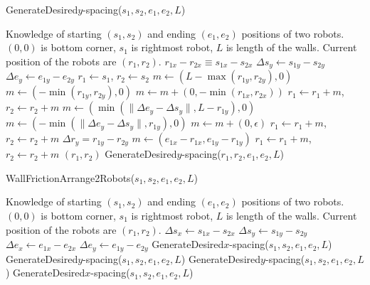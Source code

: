 \begin{algorithm}
\caption{GenerateDesired$y$-spacing($s_1,s_2,e_1,e_2,L$)}\label{alg:YControl}
\begin{algorithmic}[1]
\Require Knowledge of starting $(s_1,s_2)$ and ending $(e_1,e_2)$ positions of  two robots. 
$(0,0)$ is bottom corner, $s_1$ is rightmost robot, 
 $L$ is length of the walls. Current position of the robots are $(r_1,r_2)$.
\Ensure   $ r_{1x} - r_{2x}  \equiv s_{1x} - s_{2x} $   %
\State $ \Delta s_y  \gets s_{1y} - s_{2y} $
\State $ \Delta e_y \gets e_{1y} - e_{2y} $
\State $ r_1 \gets s_1$, $ r_2 \gets s_2$
\State $ m \gets ( L-\max( r_{1y},r_{2y}) ,0)   $ 
\Else 
\State  $ m \gets ( -\min( r_{1y},r_{2y}),0 )    $ 
\EndIf
\State $m  \gets  m + (0, -\min( r_{1x},r_{2x} ))$ 
\State $ r_1 \gets r_1+m$, $ r_2 \gets r_2+m$ 
\State $ m \gets (\min(\|\Delta e_y - \Delta s_y \|, L- r_{1y}), 0)$  
\Else
\State $ m \gets (-\min(\|\Delta e_y - \Delta s_y \|, r_{1y}), 0)$
\EndIf 
\State $m  \gets  m + (0, \epsilon)$ 
\State $ r_1 \gets r_1+m$, $ r_2 \gets r_2+m$ 
\State $\Delta r_y = r_{1y} - r_{2y}$
\State   $ m \gets (e_{1x}-r_{1x}, e_{1y}-r_{1y})$
\State $ r_1 \gets r_1+m$, $ r_2 \gets r_2+m$ 
\State  \Return $(r_1,r_2)$
\Else   
\State \Return GenerateDesired$y$-spacing($r_1,r_2,e_1,e_2,L$)
\EndIf
\end{algorithmic}
\end{algorithm}

\begin{algorithm}
\caption{WallFrictionArrange2Robots($s_1,s_2,e_1,e_2,L$)}\label{alg:PosControl2Robots}
\begin{algorithmic}[1]
\Require 
Knowledge of starting $(s_1,s_2)$ and ending $(e_1,e_2)$ positions of  two robots. 
$(0,0)$ is bottom corner, $s_1$ is rightmost robot, 
 $L$ is length of the walls. 
 Current position of the robots are $(r_1,r_2)$.
\State $\Delta s_x \gets s_{1x} - s_{2x}$
\State $\Delta s_y \gets s_{1y} - s_{2y}$
\State $\Delta e_x \gets  e_{1x} - e_{2x} $
\State $ \Delta e_y \gets e_{1y} - e_{2y}$
\State GenerateDesired$x$-spacing($s_1,s_2,e_1,e_2,L$)
\State GenerateDesired$y$-spacing($s_1,s_2,e_1,e_2,L$)
\Else
\State GenerateDesired$y$-spacing($s_1,s_2,e_1,e_2,L$)
\State GenerateDesired$x$-spacing($s_1,s_2,e_1,e_2,L$)
\EndIf

\end{algorithmic}
\end{algorithm}


